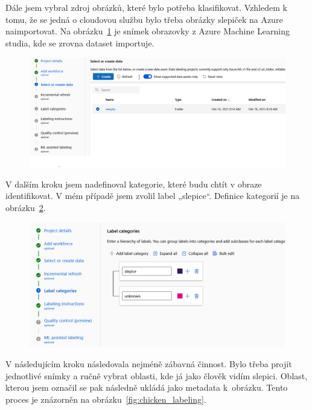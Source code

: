 Dále jsem vybral zdroj obrázků, které bylo potřeba klasifikovat.
Vzhledem k tomu, že se jedná o cloudovou službu bylo třeba obrázky slepiček na Azure naimportovat.
Na obrázku~\ref{fig:dataset_selection} je snímek obrazovky z Azure Machine Learning studia, kde se zrovna dataset importuje.

\begin{figure}[htbp]
    \centering
    \includegraphics[width=1.0\textwidth]{img/dataset_selection}
    \label{fig:dataset_selection}
\end{figure}

V dalším kroku jsem nadefinoval kategorie, které budu chtít v obraze identifikovat.
V mém případě jsem zvolil label „slepice“.
Definice kategorií je na obrázku~\ref{fig:category_definition}.

\begin{figure}[htbp]
    \centering
    \includegraphics[width=1.0\textwidth]{img/category_definition}
    \label{fig:category_definition}
\end{figure}

V následujícím kroku následovala nejméně zábavná činnost.
Bylo třeba projít jednotlivé snímky a ručně vybrat oblasti, kde já jako člověk vidím slepici.
Oblast, kterou jsem označil se pak následně ukládá jako metadata k~obrázku.
Tento proces je znázorněn na obrázku~\ref{fig:chicken_labeling}.

